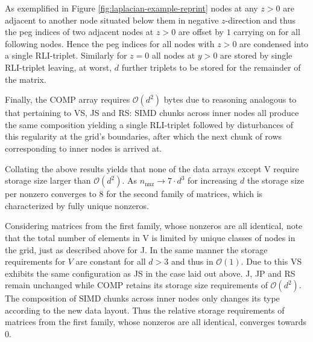     As exemplified in Figure \ref{fig:laplacian-example-reprint} nodes at any $z > 0$ are adjacent to another node
    situated below them in negative $z$-direction and thus the peg indices of two adjacent nodes at $z > 0$ are offset
    by $1$ carrying on for all following nodes. Hence the peg indices for all nodes with $z > 0$ are condensed into a
    single RLI-triplet. Similarly for $z = 0$ all nodes at $y > 0$ are stored by single RLI-triplet leaving, at worst,
    $d$ further triplets to be stored for the remainder of the matrix.
 
    Finally, the COMP array requires $\mathcal{O}(d^2)$ bytes due to reasoning analogous to that pertaining to VS, JS
    and RS: SIMD chunks across inner nodes all produce the same composition yielding a single RLI-triplet followed by
    disturbances of this regularity at the grid's boundaries, after which the next chunk of rows corresponding to inner
    nodes is arrived at.

    Collating the above results yields that none of the data arrays except V require storage size larger than
    $\mathcal{O}(d^2)$. As $n_{\text{nnz}} \rightarrow 7\cdot d^3$ for increasing $d$ the storage size per nonzero
    converges to 8 for the second family of matrices, which is characterized by fully unique nonzeros.

    \begin{center}
    \end{center}

    Considering matrices from the first family, whose nonzeros are all identical, note that the total number of elements
    in V is limited by unique classes of nodes in the grid, just as described above for J. In the same manner the
    storage requirements for $V$ are constant for all $d > 3$ and thus in $\mathcal{O}(1)$. Due to this VS exhibits the
    same configuration as JS in the case laid out above. J, JP and RS remain unchanged while COMP retains its storage
    size requirements of $\mathcal{O}(d^2)$. The composition of SIMD chunks across inner nodes only changes its type
    according to the new data layout. Thus the relative storage requirements of matrices from the first family, whose
    nonzeros are all identical, converges towards $0$.

